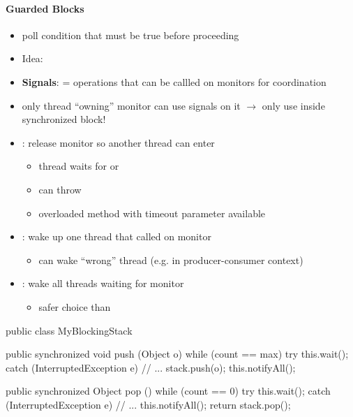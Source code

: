\paragraph{Guarded Blocks}
\begin{itemize}
  \item poll condition that must be true before proceeding
  \item Idea: 
  \item \textbf{Signals}: = operations that can be callled on monitors for coordination
  \item only thread ``owning'' monitor can use signals on it \( \to \) only use inside synchronized block!
  \item {}: release monitor so another thread can enter
  \begin{itemize}
    \item thread waits for  or 
    \item can throw 
    \item overloaded method with timeout parameter available
  \end{itemize}
  \item {}: wake up one thread that called  on monitor
  \begin{itemize}
    \item can wake ``wrong'' thread (e.g. in producer-consumer context)
  \end{itemize}
  \item {}: wake all threads waiting for monitor
  \begin{itemize}
    \item safer choice than 
  \end{itemize}
\end{itemize}
\begin{java}
  public class MyBlockingStack {
    public synchronized void push (Object o) {
      while (count == max) {
        try {
          this.wait();
        } catch (InterruptedException e) {
          // ...
        }
      }
      stack.push(o);
      this.notifyAll();
    }

    public synchronized Object pop () {
      while (count == 0) {
        try {
          this.wait();
        } catch (InterruptedException e) {
          // ...
        }
      }
      this.notifyAll();
      return stack.pop();
    }
  }
\end{java}

